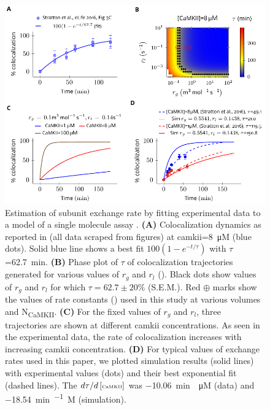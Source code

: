 \documentclass[9pt,lineno,doublespacing]{elife}
\newcommand\SUB[2]{#1\textsubscript{#2}}
\begin{document}
\begin{figure}[ht!]
    \includegraphics[width=0.95\linewidth]{./PaperFigures/elifeFigure7/figure_exchange_rate.pdf}
    \caption{Estimation of subunit exchange rate by fitting experimental
        data to a model of  a single molecule assay \cite{stratton_activation-triggered_2014}. 
        \textbf{(A)} Colocalization dynamics as reported in 
        \cite{stratton_activation-triggered_2014} (all data scraped from figures) at
        \gls{camkii}=\SI{8}{\micro M} (blue dots). Solid blue line shows a best
        fit $100(1-e^{-t/\tau})$ with $\tau$=\SI{62.7}{min}. 
        \textbf{(B)} Phase plot of $\tau$ of colocalization trajectories generated 
        for various values of $r_g$ and $r_l$ (). Black dots show values
        of $r_g$ and $r_l$ for which $\tau=62.7\pm 20\%$ (S.E.M.). Red
        $\oplus$ marks show the values of rate constants () 
        used in this study at various volumes and \SUB{N}{CaMKII}. 
        \textbf{(C)} For the fixed values of $r_g$ and $r_l$, three trajectories 
        are shown at different \gls{camkii} concentrations. As seen in the experimental data, 
        the rate of colocalization increases with increasing \gls{camkii} concentration. 
        \textbf{(D)} For typical values of exchange rates used in this paper, we plotted
        simulation results (solid lines) with experimental values (dots) and their best
        exponential fit (dashed lines). The ${d\tau}/{d\left[\text{\tiny CaMKII}\right]}$ 
        was \SI{-10.06}{min \per \micro M} (data) and \SI{-18.54}{min\per\micro
        M} (simulation).
    }\label{fig:estimate_of_exchange_rate}
\end{figure}
\end{document}
